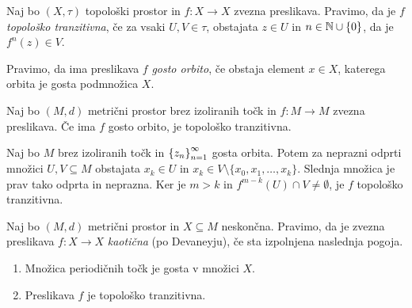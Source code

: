 \begin{definicija}
    Naj bo \((X, \tau)\) topološki prostor in \(f \colon X \to X\) zvezna preslikava. Pravimo, da je \(f\) \emph{topološko tranzitivna}, če za vsaki \(U, V \in \tau\), obstajata \(z \in U\) in \(n \in \mathbb N \cup \left\{ 0 \right\}\), da je \(f^n (z) \in V\).
\end{definicija}

Pravimo, da ima preslikava \(f\) \emph{gosto orbito}, če obstaja element \(x \in X\), katerega orbita je gosta podmnožica \(X\).

\begin{trditev} \label{prop:tridevet}
    Naj bo \((M, d)\) metrični prostor brez izoliranih točk in \(f \colon M \to M\) zvezna preslikava. Če ima \(f\) gosto orbito, je topološko tranzitivna.
\end{trditev}

\begin{dokaz}
    Naj bo \(M\) brez izoliranih točk in \(\left\{ z_n \right\}_{n = 1}^{\infty}\) gosta orbita. Potem za neprazni odprti množici \(U, V \subseteq M\) obstajata \(x_k \in U\) in \(x_k \in V \setminus \{x_0, x_1, \dots, x_k\}\). Slednja množica je prav tako odprta in neprazna. Ker je \(m > k\) in \(f^{m - k} (U) \cap V \neq \emptyset\), je \(f\) topološko tranzitivna.

\end{dokaz}

\begin{definicija}
    Naj bo \((M, d)\) metrični prostor in \(X \subseteq M\) neskončna. Pravimo, da je zvezna preslikava \(f \colon X \to X\) \emph{kaotična} (po Devaneyju), če sta izpolnjena naslednja pogoja.
    \begin{enumerate}
        \item Množica periodičnih točk je gosta v množici \(X\).
        \item Preslikava \(f\) je topološko tranzitivna.
    \end{enumerate}
\end{definicija}

